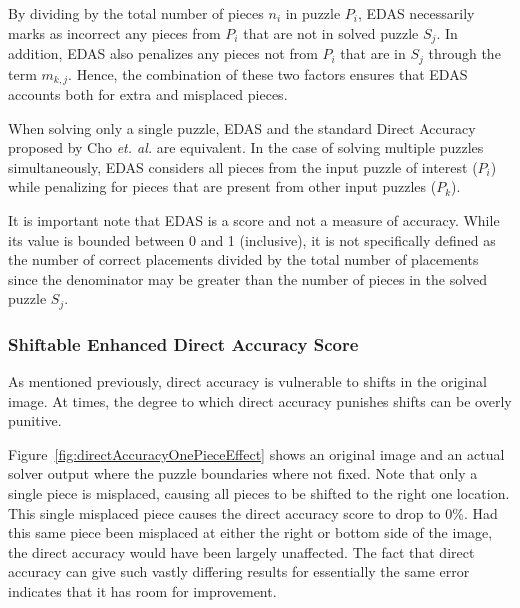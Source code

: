 \documentclass{report}
\begin{document}
By dividing by the total number of pieces $n_i$ in puzzle $P_i$, EDAS necessarily marks as incorrect any pieces from $P_i$ that are not in solved puzzle $S_j$.  In addition, EDAS also penalizes any pieces not from $P_i$ that are in $S_j$ through the term $m_{k,j}$.  Hence, the combination of these two factors ensures that EDAS accounts both for extra and misplaced pieces.

When solving only a single puzzle, EDAS and the standard Direct Accuracy proposed by Cho \textit{et. al.} are equivalent.  In the case of solving multiple puzzles simultaneously, EDAS considers all pieces from the input puzzle of interest ($P_i$) while penalizing for pieces that are present from other input puzzles ($P_k$). 

It is important note that EDAS is a score and not a measure of accuracy. While its value is bounded between 0 and 1 (inclusive), it is not specifically defined as the number of correct placements divided by the total number of placements since the denominator may be greater than the number of pieces in the solved puzzle $S_j$.

\subsubsection{Shiftable Enhanced Direct Accuracy Score}\label{sec:shiftableEnhancedDirectAccuracy}

As mentioned previously, direct accuracy is vulnerable to shifts in the original image.  At times, the degree to which direct accuracy punishes shifts can be overly punitive. 

Figure~\ref{fig:directAccuracyOnePieceEffect} shows an original image and an actual solver output where the puzzle boundaries where not fixed.  Note that only a single piece is misplaced, causing all pieces to be shifted to the right one location.  This single misplaced piece causes the direct accuracy score to drop to 0\%.  Had this same piece been misplaced at either the right or bottom side of the image, the direct accuracy would have been largely unaffected.  The fact that direct accuracy can give such vastly differing results for essentially the same error indicates that it has room for improvement.
\end{document}
